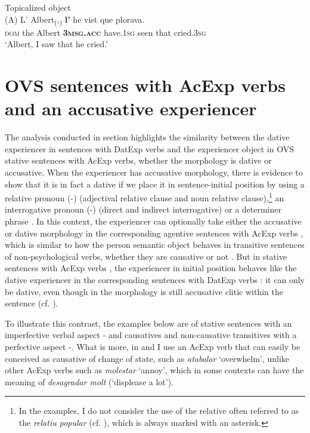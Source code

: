 \documentclass[output=paper,colorlinks,citecolor=brown,modfonts,nonflat]{langsci/langscibook}
\begin{document}
{{ \ex Topicalized object\label{ex:royo:13d}\\
 \gll (A) L’ Albert\textsubscript{(},\textsubscript{)} \textbf{l’} he vist que plorava.\\
\textsc{dom}  the Albert \textbf{\textsc{3msg.acc}} have.\textsc{1sg} seen that cried.\textsc{3sg}\\
\glt ‘Albert, I saw that he cried.’
 \z
 \z


\section{OVS sentences with AcExp verbs and an accusative experiencer}\label{sec:royo:4}

The analysis conducted in section  highlights the similarity between the dative experiencer in sentences with DatExp verbs and the experiencer object in OVS stative sentences with AcExp verbs, whether the morphology is dative or accusative. When the experiencer has accusative morphology, there is evidence to show that it is in fact a dative if we place it in sentence-initial position by using a relative pronoun (-) (adjectival relative clause and noun relative clause),\footnote{In the examples, I do not consider the use of the relative often referred to as the \textit{relatiu popular} (cf. \citealt[154--155]{Ginebra2005}), which is always marked with an asterisk.} an interrogative pronoun (-) (direct and indirect interrogative) or a determiner phrase . In this context, the experiencer can optionally take either the accusative or dative morphology in the corresponding agentive sentences with AcExp verbs , which is similar to how the person semantic object behaves in transitive sentences of non-psychological verbs, whether they are causative or not . But in stative sentences with AcExp verbs , the experiencer in initial position behaves like the dative experiencer in the corresponding sentences with DatExp verbs : it can only be dative, even though in  the morphology is still accusative clitic within the sentence (cf. \citealt[Section 4.3.4]{Royo2017}).

To illustrate this contrast, the examples below are of stative sentences with an imperfective verbal aspect - and causatives and non-causative transitives with a perfective aspect -. What is more, in  and  I use an AcExp verb that can easily be conceived as causative of change of state, such as \textit{atabalar} ‘overwhelm’, unlike other AcExp verbs such as \textit{molestar} ‘annoy’, which in some contexts can have the meaning of  \textit{desagradar molt} (‘displease a lot’).

}}
\end{document}
